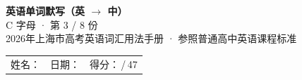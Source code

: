 \documentclass[10pt,a4paper]{article}
\begin{document}
\pagestyle{plain}

\begin{center}
{\LARGE\bfseries 英语单词默写（英 $\to$ 中）}\\[0.22em]
{\large C 字母 · 第 3 / 8 份}\\[0.18em]
{\small 2026年上海市高考英语词汇用法手册 · 参照普通高中英语课程标准}
\end{center}

\vspace{0.25em}
\noindent\begin{tabular}{@{}p{}@{}p{}@{}p{}@{}}
姓名：\underline{\hspace{2.0cm}} & 日期：\underline{\hspace{2.0cm}} & 得分：\underline{\hspace{1.3cm}}\,/\,47 \\
\end{tabular}

\vspace{0.3em}

\vspace{0.08em}
\end{document}
